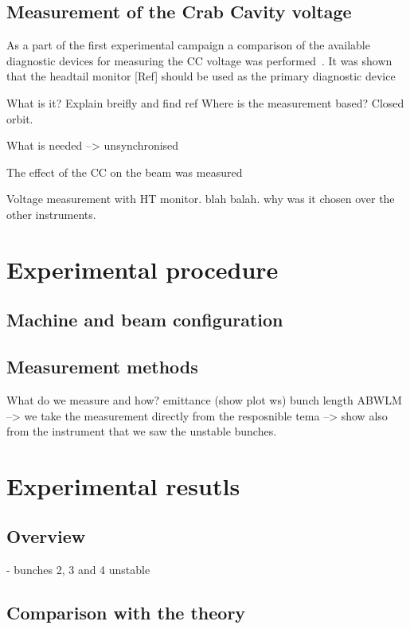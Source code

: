 \subsection{Measurement of the Crab Cavity voltage}


As a part of the first experimental campaign a comparison of the available diagnostic devices for measuring the CC voltage was performed~\cite{Carver:2696108}. It was shown that the headtail monitor [Ref] should be used as the primary diagnostic device %


What is it? Explain breifly and find ref
Where is the measurement based? Closed orbit.

What is needed --> unsynchronised

The effect of the CC on the beam was measured 

Voltage measurement with HT monitor. blah balah. why was it chosen over the other instruments.

\section{Experimental procedure}

\subsection{Machine and beam configuration}
\subsection{Measurement methods}
 What do we measure and how? emittance (show plot ws)
 bunch length ABWLM --> we take the measurement directly from the resposnible tema
 --> show also from the instrument that we saw the unstable bunches.

 \section{Experimental resutls}
 \subsection{Overview}
 - bunches 2, 3 and 4 unstable
 \subsection{Comparison with the theory}

